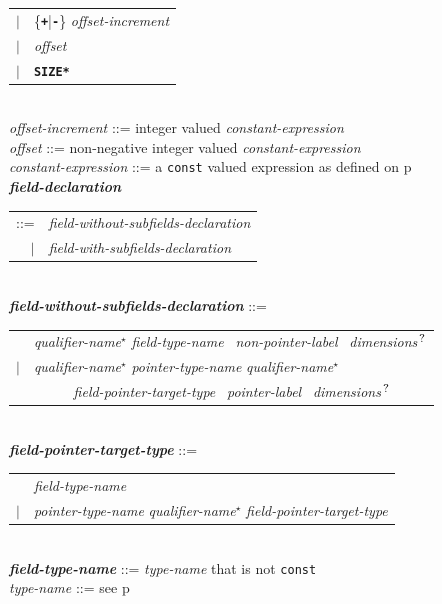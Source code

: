 \documentclass[12pt]{article}
\newcommand{\TT}[1]{{\tt \bfseries #1}}
\newcommand{\STAR}{{\Large $^\star$}}
\newcommand{\QMARK}{{$^{\,\mbox{\footnotesize ?}}$}}
\newcommand{\ttkey}[1]{{\tt \bfseries #1}}
\newcommand{\emkey}[1]{{\em \bfseries #1}}
\newcommand{\pagref}[1]{p\pageref{#1}}
\newenvironment{indpar}[1][0.3in]%
	{\begin{list}{}%
		     {\setlength{\itemsep}{0in}%
		      \setlength{\topsep}{0in}%
		      \setlength{\parsep}{1ex}%
		      \setlength{\labelwidth}{#1}%
		      \setlength{\leftmargin}{#1}%
		      \addtolength{\leftmargin}{\labelsep}}%
	 \item}%
	{\end{list}}
\begin{document}
\begin{indpar}
\begin{tabular}[t]{@{}rl}
    $|$ &  \{\TT{+}|\TT{-}\} {\em offset-increment} \\
    $|$ &  {\em offset} \\
    $|$ &  \ttkey{*SIZE*} \\
    \end{tabular} \\
{\em offset-increment} ::=
    integer valued {\em constant-expression} \\
{\em offset} ::=
    non-negative integer valued {\em constant-expression} \\
{\em constant-expression} ::= a {\tt const} valued expression as
    defined on \pagref{CONSTANT-EXPRESSION}
\\[2ex]
\emkey{field-declaration}\label{FIELD-DECLARATION}
    \begin{tabular}[t]{@{}rl}
    ::= &  {\em field-without-subfields-declaration} \\
    $|$ &  {\em field-with-subfields-declaration} \\
    \end{tabular}
\\[2ex]
\emkey{field-without-subfields-declaration} ::= \\
\hspace*{0.5in}\begin{tabular}{rl}
        & {\em qualifier-name}\STAR{} {\em field-type-name}~
          {\em non-pointer-label}~ {\em dimensions}\QMARK{} \\
    $|$ & {\em qualifier-name}\STAR{}
                {\em pointer-type-name} {\em qualifier-name}\STAR{} \\
        & ~~~~~ {\em field-pointer-target-type}~
                {\em pointer-label}~ {\em dimensions}\QMARK{}
	\end{tabular}
\\[2ex]
\emkey{field-pointer-target-type} ::= \\
\hspace*{0.5in}\begin{tabular}[t]{@{}rl}
        &  {\em field-type-name} \\
    $|$ &  {\em pointer-type-name} {\em qualifier-name}\STAR{}
           {\em field-pointer-target-type} \\
    \end{tabular}
\\[2ex]
\emkey{field-type-name} ::= {\em type-name} that is not {\tt const} \\
{\em type-name} ::= see \pagref{TYPE-NAME} \\

\end{indpar}
\end{document}
